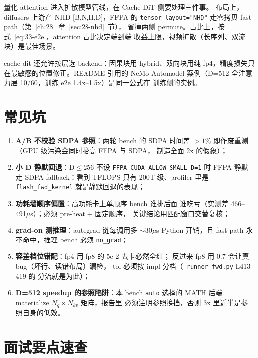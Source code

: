 量化 attention 进入扩散模型管线，在 Cache-DiT 侧要处理三件事。
布局上，diffusers 上游产 NHD [B,N,H,D]，FFPA 的
\texttt{tensor\_layout="NHD"} 走零拷贝 fast path（第~\ref{ch:28}~章~\ref{sec:28-nhd}~节），
省掉两侧 permute。占比上，按式~\ref{eq:33-e2e}，attention 占比决定端到端
收益上限，视频扩散（长序列、双流块）是最佳场景。

cache-dit 还允许按层选 backend：因果块用 hybrid、双向块用纯
fp4，精度损失只在最敏感的位置修正。README 引用的 NeMo Automodel
案例（D=512 全注意力层 10/60，训练 e2e 1.4x--1.5x）是同一公式在
训练侧的实例。

\section{常见坑}

\begin{enumerate}[itemsep=0pt,topsep=2pt]
  \item \textbf{A/B 不校验 SDPA 参照}：两轮 bench 的 SDPA 时间差
        $>1\%$ 即作废重测（GPU 级污染会同时抬高 FFPA 与 SDPA，
        制造全面 2x 的假象）；
  \item \textbf{小 D 静默回退}：D$\le$256 不设
        \texttt{FFPA\_CUDA\_ALLOW\_SMALL\_D=1} 时 FFPA 静默走
        SDPA fallback：看到 TFLOPS 只有 200T 级、profiler 里是
        \texttt{flash\_fwd\_kernel} 就是静默回退的表现；
  \item \textbf{功耗墙顺序偏置}：高功耗卡上单顺序 bench 谁排后面
        谁吃亏（实测差 466--491$\mu$s）；必须 pre-heat + 固定顺序，
        关键结论用匹配窗口交替复核；
  \item \textbf{grad-on 测推理}：autograd 链每调用多 $\sim$30$\mu$s
        Python 开销，且 fast path 永不命中，推理 bench 必须
        \texttt{no\_grad}；
  \item \textbf{容差档位错配}：fp4 用 fp8 的 5e-2 去卡必然全红；
        反过来 fp8 用 0.7 会让真 bug（坏行、读错布局）漏检，
        tol 必须按 impl 分档（\texttt{\_runner\_fwd.py} L413--419 的
        分流就是为此）；
  \item \textbf{D=512 speedup 的参照陷阱}：本 bench \texttt{auto}
        选择的 MATH 后端 materialize $N_q\times N_{kv}$ 矩阵，报告里
        必须注明参照换挡，否则 3x 里近半是参照自身的低效。
\end{enumerate}

\section{面试要点速查}

